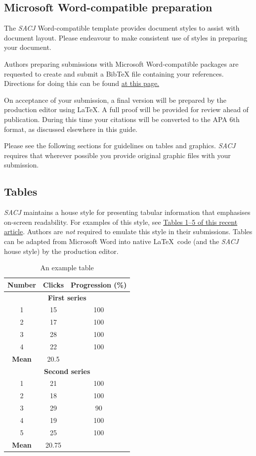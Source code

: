 \documentclass{article}
\begin{document}
\subsection{Microsoft Word-compatible preparation}
The {\em SACJ} Word-compatible template provides document styles to assist with document layout. Please endeavour to make consistent use of styles in preparing your document. 

Authors preparing submissions with Microsoft Word-compatible packages are requested to create and submit a BibTeX file containing your references. Directions for doing this can be found \href{http://sacj.cs.uct.ac.za/index.php/sacj/about/submissions#authorGuidelines}{at this page.}

On acceptance of your submission, a final version will be prepared by the production editor using \LaTeX. A full proof will be provided for review ahead of publication. During this time your citations will be converted to the APA 6th format, as discussed elsewhere in this guide. 

Please see the following sections for guidelines on tables and graphics. {\em SACJ} requires that wherever possible you provide original graphic files with your submission.  

\subsection{Tables}
{\em SACJ} maintains a house style for presenting tabular information that emphasises on-screen readability. For examples of this style, see \href{http://sacj.cs.uct.ac.za/index.php/sacj/article/view/367/180}{Tables 1--5 of this recent article}. Authors are {\em not} required to emulate this style in their submissions. Tables can be adapted from Microsoft Word into native \LaTeX~code (and the {\em SACJ} house style) by the production editor. 

\begin{table}[ht]
\centering 
\caption{An example table}
\label{table1}
\begin{tabular} {| c | c | c |} \hline
{\bfseries Number} & {\bfseries Clicks} & {\bfseries Progression (\%) }\\ \hline
\multicolumn{3}{|c|}{{\bfseries First series}} \\ \hline
1 & 15 & 100 \\
2 & 17 & 100 \\
3 & 28 & 100 \\
4 & 22 & 100 \\ \hline
{\bfseries Mean } & { 20.5} & \\ \hline
\multicolumn{3}{|c|}{{\bfseries Second series}} \\ \hline
1 & 21 & 100 \\
2 & 18 & 100 \\
3 & 29 & 90 \\
4 & 19 & 100 \\
5 & 25 & 100 \\ \hline
{\bfseries Mean} & { 20.75} & \\ \hline
\end{tabular}
\end{table}
\end{document}
